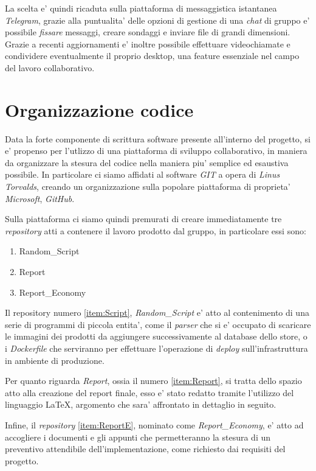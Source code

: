\documentclass[a4paper]{report}
\begin{document}
		La scelta e' quindi ricaduta sulla piattaforma di messaggistica istantanea \emph{Telegram}, grazie alla
		puntualita' delle opzioni di gestione di una \emph{chat} di gruppo e' possibile \emph{fissare} messaggi, creare
		sondaggi e inviare file di grandi dimensioni. Grazie a recenti aggiornamenti e' inoltre possibile effettuare
		videochiamate e condividere eventualmente il proprio desktop, una feature essenziale nel campo del lavoro
		collaborativo.
	\section{Organizzazione codice} \label{organizzazione codice}
		Data la forte componente di scrittura software presente all'interno del progetto, si e' propenso per l'utlizzo
		di una piattaforma di sviluppo collaborativo, in maniera da organizzare la stesura del codice nella maniera piu'
		semplice ed esaustiva possibile. In particolare ci siamo affidati al software \emph{GIT} a opera di \emph{Linus
		Torvalds}, creando un organizzazione sulla popolare piattaforma di proprieta' \emph{Microsoft}, \emph{GitHub}.

		Sulla piattaforma ci siamo quindi premurati di creare immediatamente tre \emph{repository} atti a contenere il
		lavoro prodotto dal gruppo, in particolare essi sono:
		\begin{enumerate}
			\item Random\_Script\label{item:Script}
			\item Report\label{item:Report}
			\item Report\_Economy\label{item:ReportE}
		\end{enumerate}

		Il repository numero \ref{item:Script}{, \emph{Random\_Script}} e' atto al contenimento di una serie di
		programmi di piccola entita', come il \emph{parser} che si e' occupato di scaricare le immagini dei prodotti da
		aggiungere successivamente al database dello store, o i \emph{Dockerfile} che serviranno per effettuare l'operazione di \emph{deploy} sull'infrastruttura in ambiente di produzione.

		Per quanto riguarda \emph{Report}, ossia il numero \ref{item:Report}, si tratta dello spazio atto alla creazione
		del report finale, esso e' stato redatto tramite l'utilizzo del linguaggio \LaTeX{}, argomento che sara'
		affrontato in dettaglio in seguito.

		Infine, il \emph{repository} \ref{item:ReportE}, nominato come \emph{Report\_Economy}, e' atto ad accogliere i
		documenti e gli appunti che permetteranno la stesura di un preventivo attendibile dell'implementazione, come
		richiesto dai requisiti del progetto.
\end{document}
